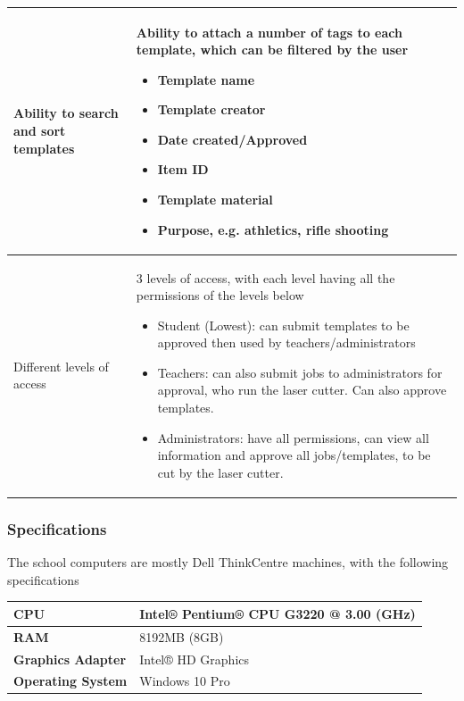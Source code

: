 \documentclass[oneside,openany,11pt,a4paper]{report}
\begin{document}
\begin{longtable}{|p{4cm}|p{10cm}|}
Ability to search and sort templates  & Ability to attach a number of tags to each template, which can be filtered by the user
	\begin{itemize}
		\itemsep0em
		\item Template name
		\item Template creator
		\item Date created/Approved
		\item Item ID
		\item Template material
		\item Purpose, e.g. athletics, rifle shooting
	\end{itemize} \\ \hline

Different levels of access & 3 levels of access, with each level having all the permissions of the levels below
\begin{itemize}
	\itemsep0em
	\item Student (Lowest): can submit templates to be approved then used by teachers/administrators
	\item Teachers: can also submit jobs to administrators for approval, who run the laser cutter. Can also approve templates.
	\item Administrators: have all permissions, can view all information and approve all jobs/templates, to be cut by the laser cutter.
\end{itemize} \\ \hline

\end{longtable}


\subsubsection{Specifications}
The school computers are mostly Dell ThinkCentre machines, with the following specifications \newline 


\begin{longtable}{|p{6cm}|p{6cm}|}
	\hline
	\rowcolor{gray!25}
	\textbf{CPU} &  Intel® Pentium® CPU G3220 @ 3.00 (GHz) \\ \hline

	\textbf{RAM} &  8192MB (8GB) \\ \hline

\rowcolor{gray!25}
	\textbf{Graphics Adapter} &  Intel® HD Graphics \\ \hline

	\textbf{Operating System} &  Windows 10 Pro \\ \hline
	 
\end{longtable}
\end{document}
